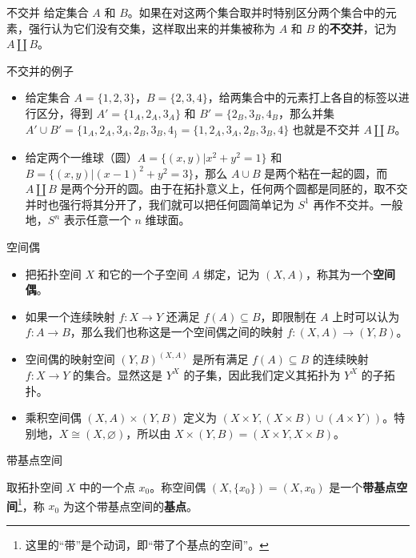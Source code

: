 

\begin{definition}{不交并}\label{def_Topo9_3}
给定集合 $A$ 和 $B$。如果在对这两个集合取并时特别区分两个集合中的元素，强行认为它们没有交集，这样取出来的并集被称为 $A$ 和 $B$ 的\textbf{不交并}，记为 $A\amalg B$。
\end{definition}

\begin{example}{不交并的例子}
\begin{itemize}
\item 给定集合 $A=\{1,2,3\}$，$B=\{2,3,4\}$，给两集合中的元素打上各自的标签以进行区分，得到 $A'=\{1_A, 2_A, 3_A\}$ 和 $B'=\{2_B, 3_B, 4_B$，那么并集 $A'\cup B'=\{1_A, 2_A, 3_A, 2_B, 3_B, 4_\}=\{1, 2_A, 3_A, 2_B, 3_B, 4\}$ 也就是不交并 $A\amalg B$。
\item 给定两个一维球（圆）$A=\{(x, y)|x^2+y^2=1\}$ 和 $B=\{(x, y)|(x-1)^2+y^2=3\}$，那么 $A\cup B$ 是两个粘在一起的圆，而 $A\amalg B$ 是两个分开的圆。由于在拓扑意义上，任何两个圆都是同胚的，取不交并时也强行将其分开了，我们就可以把任何圆简单记为 $S^1$ 再作不交并。一般地，$S^n$ 表示任意一个 $n$ 维球面。
\end{itemize}
\end{example}

\begin{definition}{空间偶}
\begin{itemize}
\item 把拓扑空间 $X$ 和它的一个子空间 $A$ 绑定，记为 $(X, A)$，称其为一个\textbf{空间偶}。
\item 如果一个连续映射 $f:X\rightarrow Y$ 还满足 $f(A)\subseteq B$，即限制在 $A$ 上时可以认为 $f:A\rightarrow B$，那么我们也称这是一个空间偶之间的映射 $f:(X, A)\rightarrow(Y, B)$。
\item 空间偶的映射空间 $(Y, B)^{(X, A)}$ 是所有满足 $f(A)\subseteq B$ 的连续映射 $f:X\rightarrow Y$ 的集合。显然这是 $Y^X$ 的子集，因此我们定义其拓扑为 $Y^X$ 的子拓扑。
\item 乘积空间偶 $(X, A)\times(Y,B)$ 定义为 $(X\times Y, (X\times B)\cup(A\times Y))$。特别地，$X\cong(X, \varnothing)$，所以由 $X\times(Y, B)=(X\times Y, X\times B)$。


\end{itemize}
\end{definition}

\begin{definition}{带基点空间}\label{def_Topo9_2}

取拓扑空间 $X$ 中的一个点 $x_0$。称空间偶 $(X, \{x_0\})=(X, x_0)$ 是一个\textbf{带基点空间}\footnote{这里的“带”是个动词，即“带了个基点的空间”。}，称 $x_0$ 为这个带基点空间的\textbf{基点}。

\end{definition}


